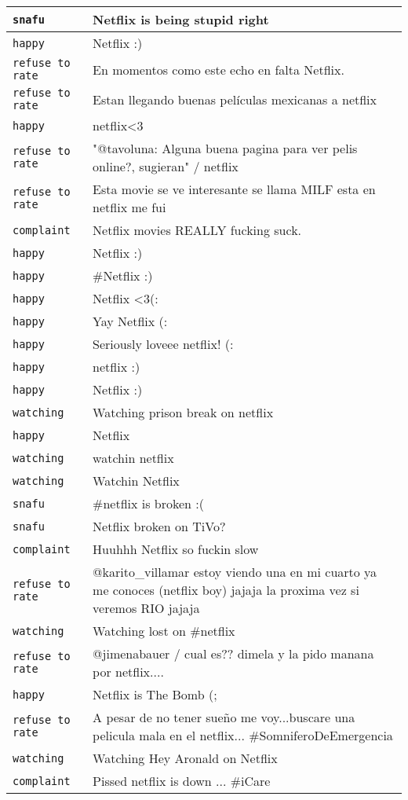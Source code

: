 {\begin{longtable}{|l|p{160mm}|}
      \tabularnewline\hline
         \texttt{snafu} & Netflix is being stupid right
      \tabularnewline\hline
         \texttt{happy} & Netflix :)
      \tabularnewline\hline
         \texttt{refuse to rate} & En momentos como este echo en falta Netflix.
      \tabularnewline\hline
         \texttt{refuse to rate} & Estan llegando buenas películas mexicanas a netflix
      \tabularnewline\hline
         \texttt{happy} & netflix<3
      \tabularnewline\hline
         \texttt{refuse to rate} & "@tavoluna: Alguna buena pagina para ver pelis online?, sugieran" / netflix
      \tabularnewline\hline
         \texttt{refuse to rate} & Esta movie se ve interesante se llama MILF esta en netflix me fui
      \tabularnewline\hline
         \texttt{complaint} & Netflix movies REALLY fucking suck.
      \tabularnewline\hline
         \texttt{happy} & Netflix :)
      \tabularnewline\hline
         \texttt{happy} & \#Netflix :)
      \tabularnewline\hline
         \texttt{happy} & Netflix <3(:
      \tabularnewline\hline
         \texttt{happy} & Yay Netflix (:
      \tabularnewline\hline
         \texttt{happy} & Seriously loveee netflix! (:
      \tabularnewline\hline
         \texttt{happy} & netflix :)
      \tabularnewline\hline
         \texttt{happy} & Netflix :)
      \tabularnewline\hline
         \texttt{watching} & Watching prison break on netflix
      \tabularnewline\hline
         \texttt{happy} & Netflix
      \tabularnewline\hline
         \texttt{watching} & watchin netflix
      \tabularnewline\hline
         \texttt{watching} & Watchin Netflix
      \tabularnewline\hline
         \texttt{snafu} & \#netflix is broken :(
      \tabularnewline\hline
         \texttt{snafu} & Netflix broken on TiVo?
      \tabularnewline\hline
         \texttt{complaint} & Huuhhh Netflix so fuckin slow
      \tabularnewline\hline
         \texttt{refuse to rate} & @karito\_villamar estoy viendo una en mi cuarto ya me conoces (netflix boy) jajaja la proxima vez si veremos RIO jajaja
      \tabularnewline\hline
         \texttt{watching} & Watching lost on \#netflix
      \tabularnewline\hline
         \texttt{refuse to rate} & @jimenabauer / cual es?? dimela y la pido manana por netflix....
      \tabularnewline\hline
         \texttt{happy} & Netflix is The Bomb (;
      \tabularnewline\hline
         \texttt{refuse to rate} & A pesar de no tener sueño me voy...buscare una pelicula mala en el netflix... \#SomniferoDeEmergencia
      \tabularnewline\hline
         \texttt{watching} & Watching Hey Aronald on Netflix
      \tabularnewline\hline
         \texttt{complaint} & Pissed netflix is down ... \#iCare

\end{longtable}}
